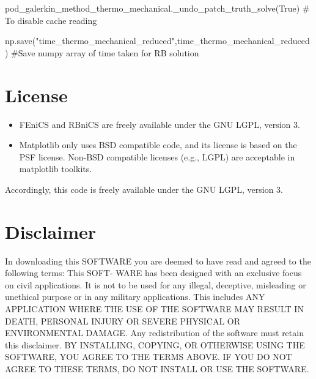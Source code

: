 \begin{python}
pod_galerkin_method_thermo_mechanical._undo_patch_truth_solve(True) # To disable cache reading

np.save("time_thermo_mechanical_reduced",time_thermo_mechanical_reduced) #Save numpy array of time taken for RB solution
\end{python}

\section{License}

\begin{itemize}
\item FEniCS and RBniCS are freely available under the GNU LGPL, version 3.
\item Matplotlib only uses BSD compatible code, and its license is based on the PSF license. Non-BSD compatible licenses (e.g., LGPL) are acceptable in matplotlib toolkits.
\end{itemize}

Accordingly, this code is freely available under the GNU LGPL, version 3.

\section{Disclaimer}

In downloading this SOFTWARE you are deemed to have read and agreed to the following terms: This SOFT- WARE has been designed with an exclusive focus on civil applications. It is not to be used for any illegal, deceptive, misleading or unethical purpose or in any military applications. This includes ANY APPLICATION WHERE THE USE OF THE SOFTWARE MAY RESULT IN DEATH, PERSONAL INJURY OR SEVERE PHYSICAL OR ENVIRONMENTAL DAMAGE. Any redistribution of the software must retain this disclaimer. BY INSTALLING, COPYING, OR OTHERWISE USING THE SOFTWARE, YOU AGREE TO THE TERMS ABOVE. IF YOU DO NOT AGREE TO THESE TERMS, DO NOT INSTALL OR USE THE SOFTWARE.
